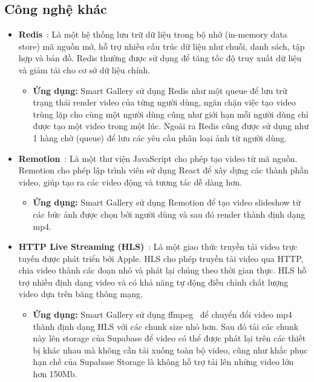 \subsection{Công nghệ khác}
\begin{itemize}
    \item \textbf{Redis}~\cite{redisdoc}: Là một hệ thống lưu trữ dữ liệu trong bộ nhớ (in-memory data store) mã nguồn mở, hỗ trợ nhiều cấu trúc dữ liệu như chuỗi, danh sách, tập hợp và bản đồ. Redis thường được sử dụng để tăng tốc độ truy xuất dữ liệu và giảm tải cho cơ sở dữ liệu chính.
    \begin{itemize}
        \item \textbf{Ứng dụng:} Smart Gallery sử dụng Redis như một queue để lưu trữ trạng thái render video của từng người dùng, ngăn chặn việc tạo video trùng lặp cho cùng một người dùng cũng như giới hạn mỗi người dùng chỉ được tạo một video trong một lúc. Ngoài ra Redis cũng được sử dụng như 1 hàng chờ (queue) để lưu các yêu cầu phân loại ảnh từ người dùng. 
    \end{itemize}
    
    \item \textbf{Remotion}~\cite{remotion}: Là một thư viện JavaScript cho phép tạo video từ mã nguồn. Remotion cho phép lập trình viên sử dụng React để xây dựng các thành phần video, giúp tạo ra các video động và tương tác dễ dàng hơn.
    \begin{itemize}
        \item \textbf{Ứng dụng:} Smart Gallery sử dụng Remotion để tạo video slideshow từ các bức ảnh được chọn bởi người dùng và sau đó render thành định dạng mp4.
    \end{itemize}
    
    \item \textbf{HTTP Live Streaming (HLS)}~\cite{hls}: Là một giao thức truyền tải video trực tuyến được phát triển bởi Apple. HLS cho phép truyền tải video qua HTTP, chia video thành các đoạn nhỏ và phát lại chúng theo thời gian thực. HLS hỗ trợ nhiều định dạng video và có khả năng tự động điều chỉnh chất lượng video dựa trên băng thông mạng.
    \begin{itemize}
        \item \textbf{Ứng dụng:} Smart Gallery sử dụng ffmpeg~\cite{ffmpeg} để chuyển đổi video mp4 thành định dạng HLS với các chunk size nhỏ hơn. Sau đó tải các chunk này lên storage của Supabase để video có thể được phát lại trên các thiết bị khác nhau mà không cần tải xuống toàn bộ video, cũng như khắc phục hạn chế của Supabase Storage là không hỗ trợ tải lên những video lớn hơn 150Mb.
    \end{itemize}
\end{itemize}